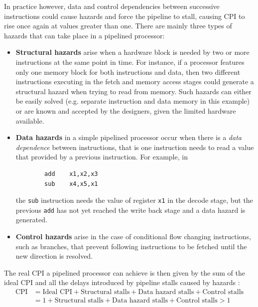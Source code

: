 In practice however, data and control dependencies between successive instructions could cause hazards and force the pipeline to stall, causing \ac{CPI} to rise once again at values greater than one. There are mainly three types of hazards that can take place in a pipelined processor:
\begin{itemize}
  \item \textbf{Structural hazards} arise when a hardware block is needed by two or more instructions at the same point in time. For instance, if a processor features only one memory block for both instructions and data, then two different instructions executing in the fetch and memory access stages could generate a structural hazard when trying to read from memory. Such hazards can either be easily solved (e.g. separate instruction and data memory in this example) or are known and accepted by the designers, given the limited hardware available.
  \item \textbf{Data hazards} in a simple pipelined processor occur when there is a \emph{data dependence} between instructions, that is one instruction needs to read a value that provided by a previous instruction. For example, in
      \begin{verbatim}
        add    x1,x2,x3
        sub    x4,x5,x1
      \end{verbatim}
      the \texttt{sub} instruction needs the value of register \texttt{x1} in the decode stage, but the previous \texttt{add} has not yet reached the write back stage and a data hazard is generated.
  \item \textbf{Control hazards} arise in the case of conditional flow changing instructions, such as branches, that prevent following instructions to be fetched until the new direction is resolved.
\end{itemize}

The real \ac{CPI} a pipelined processor can achieve is then given by the sum of the ideal \ac{CPI} and all the delays introduced by pipeline stalls caused by hazards \cite[p.~168]{hennessy17}:
\begin{equation}\label{eq:pipe_cpi}
  \begin{split}
    \text{CPI}  & = \text{Ideal CPI} + \text{Structural stalls} + \text{Data hazard stalls} + \text{Control stalls} \\
                & = 1 + \text{Structural stalls} + \text{Data hazard stalls} + \text{Control stalls} > 1
  \end{split}
\end{equation}

